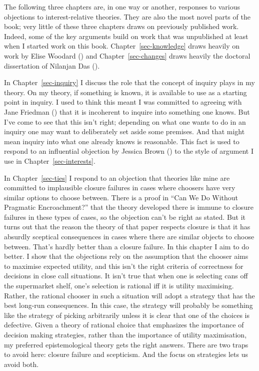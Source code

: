 \documentclass[
  12pt,
  letterpaper,
]{scrbook}
\begin{document}
The following three chapters are, in one way or another, responses to
various objections to interest-relative theories. They are also the most
novel parts of the book; very little of these three chapters draws on
previously published work. Indeed, some of the key arguments build on
work that was unpublished at least when I started work on this book.
Chapter~\ref{sec-knowledge} draws heavily on work by Elise Woodard
() and Chapter~\ref{sec-changes} draws
heavily the doctoral dissertation of Nilanjan Das
().

In Chapter~\ref{sec-inquiry} I discuss the role that the concept of
inquiry plays in my theory. On my theory, if something is known, it is
available to use as a starting point in inquiry. I used to think this
meant I was committed to agreeing with Jane Friedman
() that it is incoherent to inquire
into something one knows. But I've come to see that this isn't right;
depending on what one wants to do in an inquiry one may want to
deliberately set aside some premises. And that might mean inquiry into
what one already knows is reasonable. This fact is used to respond to an
influential objection by Jessica Brown ()
to the style of argument I use in Chapter~\ref{sec-interests}.

In Chapter~\ref{sec-ties} I respond to an objection that theories like
mine are committed to implausible closure failures in cases where
choosers have very similar options to choose between. There is a proof
in ``Can We Do Without Pragmatic Encroachment?'' that the theory
developed there is immune to closure failures in these types of cases,
so the objection can't be right as stated. But it turns out that the
reason the theory of that paper respects closure is that it has absurdly
sceptical consequences in cases where there are similar objects to
choose between. That's hardly better than a closure failure. In this
chapter I aim to do better. I show that the objections rely on the
assumption that the chooser aims to maximise expected utility, and this
isn't the right criteria of correctness for decisions in close call
situations. It isn't true that when one is selecting cans off the
supermarket shelf, one's selection is rational iff it is utility
maximising. Rather, the rational chooser in such a situation will adopt
a strategy that has the best long-run consequences. In this case, the
strategy will probably be something like the strategy of picking
arbitrarily unless it is clear that one of the choices is defective.
Given a theory of rational choice that emphasizes the importance of
decision making strategies, rather than the importance of utility
maximisation, my preferred epistemological theory gets the right
answers. There are two traps to avoid here: closure failure and
scepticism. And the focus on strategies lets us avoid both.
\end{document}
